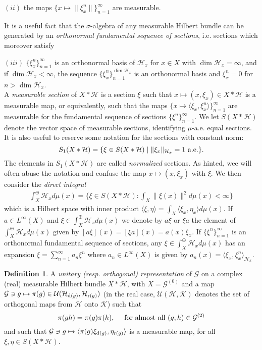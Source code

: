 \documentclass[a4paper,11pt]{article}
\numberwithin{equation}{section}
\theoremstyle{definition}
\newtheorem{defn}[thm]{Definition}
\theoremstyle{remark}
\numberwithin{equation}{section}
\newcommand{\rG}{\mathcal{G}}
\def\H{\mathcal H}
\def\K{\mathcal K}
\newcommand{\U}{\mathcal{U}}
\def\r{{\rm r}}
\def\d{{\rm d}}
\def\<{\langle}
\def\>{\rangle}
\providecommand{\norm}[1]{\lVert#1\rVert}
\numberwithin{equation}{section}
\begin{document}
$(ii)$ the maps $\{x \mapsto \|\xi^n_x\|\}_{n = 1}^\infty$ are measurable. 

It is a useful fact that the $\sigma$-algebra of any measurable Hilbert bundle can be generated by an {\it orthonormal fundamental sequence of sections}, i.e. sections which moreover satisfy 

$(iii)$ $\{\xi^n_x\}_{n = 1}^{\infty}$ is an orthonormal basis of $\H_x$ for $x \in X$ with $\dim \H_x = \infty$, and if $\dim \H_x < \infty$, the sequence $\{\xi^n_x\}_{n = 1}^{\dim \H_x}$ is an orthonormal basis and $\xi^n_x = 0$ for $n > \dim \H_x$. 
\\

A {\it measurable section} of $X \ast \H$ is a section $\xi$ such that $x \mapsto (x,\xi_x) \in X \ast \H$ is a measurable map, or equivalently, such that the maps $\{x \mapsto \<\xi_x, \xi^n_x\>\}_{n = 1}^\infty$ are measurable for the fundamental sequence of sections $\{\xi^n\}_{n = 1}^{\infty}$. We let $S(X \ast \H)$ denote the vector space of measurable sections, identifying $\mu$-a.e. equal sections. It is also useful to reserve some notation for the sections with constant norm: 
$$
S_1(X \ast \H)=\{\xi\in S(X \ast \H) \mid \norm{\xi_x}_{\H_x}=1 \textup{ a.e.}\}.
$$ The elements in $S_1(X \ast \H)$ are called {\it normalized } sections. As hinted, wee will often abuse the notation and confuse the map  $x \mapsto (x, \xi_x)$ with $\xi$.  We then consider the {\it direct integral} 
\begin{align*}
\int_X^{\oplus} \H_x d\mu(x) = \{\xi \in S(X \ast \H) : \int_X \|\xi(x)\|^2 d\mu(x) < \infty\}
\end{align*}
which is a Hilbert space with inner product $\<\xi, \eta\> = \int_X \<\xi_x, \eta_x\> d\mu(x)$. If $a \in L^\infty(X)$ and $\xi \in \int_X^{\oplus} \H_x d\mu(x)$ we denote by $a\xi$ or $\xi a$ the element of $\int_X^{\oplus} \H_x d\mu(x)$ given by $[a\xi](x) = [\xi a](x) = a(x)\xi_x$. If $\{\xi^n\}_{n = 1}^{\infty}$ is an orthonormal fundamental sequence of sections, any $\xi \in \int_X^{\oplus} \H_x d\mu(x)$ has an expansion $\xi = \sum_{n = 1}^\infty a_n\xi^n$ where $a_n\in L^\infty(X)$ is given by $a_n(x) = \<\xi_x, \xi^n_x\>_{\H_x} $. 

\begin{defn}\label{unitaryrep}
A {\it unitary (resp. orthogonal) representation} of $\rG$ on a complex (real) measurable Hilbert bundle $X \ast \H$, with $X=\rG^{(0)}$ and a map $\rG\ni g\mapsto \pi(g) \in \U(\H_{\d(g)}, \H_{\r(g)})$ (in the real case, $\U(\H, \K)$ denotes the set of orthogonal maps from $\H$ onto $\K$) such that
$$
\pi(gh)=\pi(g)\pi(h), \quad\textup{ for almost all } (g,h)\in\rG^{(2)}
$$
and such that $\rG\ni g \mapsto \<\pi(g)\xi_{\d(g)}, \eta_{\r(g)}\>$ is a measurable map, for all $\xi, \eta \in S(X \ast \H)$. 
\end{defn}
\end{document}

